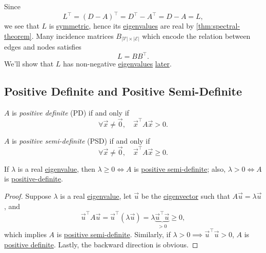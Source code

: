 \begin{remark}
	Since
	\[
		L^{\top} = (D - A)^{\top} = D^{\top} - A^{\top} = D - A = L,
	\]
	we see that \(L\) is \hyperref[def:symmetric-matrix]{symmetric}, hence its \hyperref[def:eigenvalue]{eigenvalues} are real by \autoref{thm:spectral-theorem}. Many incidence matrices \(B_{\left\vert \mathcal{V} \right\vert \times \left\vert \mathcal{E} \right\vert }\) which encode the relation between edges and nodes satisfies
	\[
		L = BB^{\top}.
	\]
	We'll show that \(L\) has non-negative \hyperref[def:eigenvalue]{eigenvalues} \hyperref[rmk:property-of-Laplacian]{later}.
\end{remark}
\subsection{Positive Definite and Positive Semi-Definite}
\begin{definition}\label{def:positive-definite}
	\(A \) is \emph{positive definite} (PD) if and only if
	\[
		\forall \vec{x} \neq  \vec{0},\quad \vec{x}^{\top}A \vec{x} > 0.
	\]
\end{definition}

\begin{definition}\label{def:positive-semi-definite}
	\(A \) is \emph{positive semi-definite} (PSD) if and only if
	\[
		\forall \vec{x} \neq  \vec{0},\quad \vec{x}^{\top}A \vec{x} \geq  0.
	\]
\end{definition}

\begin{lemma}\label{lma:lec8-1}
	If \(\lambda\) is a real \hyperref[def:eigenvalue]{eigenvalue}, then \(\lambda \geq  0 \iff A\) is \hyperref[def:positive-semi-definite]{positive semi-definite}; also, \(\lambda > 0 \iff A\) is \hyperref[def:positive-definite]{positive-definite}.
\end{lemma}
\begin{proof}
	Suppose \(\lambda\) is a real \hyperref[def:eigenvalue]{eigenvalue}, let \(\vec{u}\) be the \hyperref[def:eigenvector]{eigenvector} such that \(A \vec{u} = \lambda \vec{u}\), and
	\[
		\vec{u}^{\top} A \vec{u} = \vec{u}^{\top} (\lambda \vec{u}) = \lambda \underbrace{\vec{u}^{\top}\vec{u}}_{>0} \geq 0,
	\]
	which implies \(A\) is \hyperref[def:positive-semi-definite]{positive semi-definite}. Similarly, if \(\lambda > 0 \implies \vec{u}^{\top} \vec{u} > 0\), \(A\) is \hyperref[def:positive-definite]{positive definite}. Lastly, the backward direction is obvious.
\end{proof}

